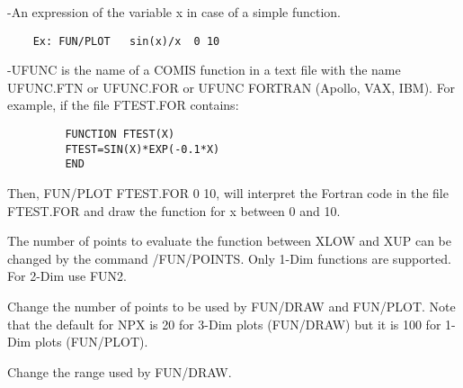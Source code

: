    \par
-An expression of the variable x in case of a simple function.  
\begin{verbatim}
    Ex: FUN/PLOT   sin(x)/x  0 10
\end{verbatim}
   \par
-UFUNC is the name of a COMIS function in a text file with the name 
   UFUNC.FTN or UFUNC.FOR or UFUNC FORTRAN (Apollo, VAX, IBM).  For example, 
   if the file FTEST.FOR contains:  
\begin{verbatim}
         FUNCTION FTEST(X)
         FTEST=SIN(X)*EXP(-0.1*X)
         END
\end{verbatim}
   \par
Then, FUN/PLOT FTEST.FOR 0 10, will interpret the Fortran code in the file 
   FTEST.FOR and draw the function for x between 0 and 10.  

   \par
The number of points to evaluate the function between XLOW and XUP can be 
   changed by the command /FUN/POINTS. Only 1-Dim functions are supported. For 
   2-Dim use FUN2.  

\ENDCMD


\BEGARG
{}
\ENDARG

   \par
Change the number of points to be used by FUN/DRAW and FUN/PLOT. Note that 
   the default for NPX is 20 for 3-Dim plots (FUN/DRAW) but it is 100 for 
   1-Dim plots (FUN/PLOT).  

\ENDCMD


\BEGARG
{}
\ENDARG

   \par
Change the range used by FUN/DRAW.  

\ENDCMD


\BEGARG
{}
\ENDARG

